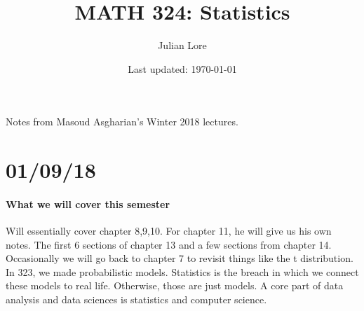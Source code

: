 \documentclass[12 pt]{article}
\author{Julian Lore}
\date{Last updated: \today}
\title{MATH 324: Statistics}
\begin{document}
	\onehalfspacing
	\maketitle
	Notes from Masoud Asgharian's Winter 2018 lectures.
	\tableofcontents
        \section{01/09/18}
        \paragraph{What we will cover this semester}
        Will essentially cover chapter 8,9,10. For chapter 11, he will
        give us his own notes. The first 6 sections of chapter 13 and
        a few sections from chapter 14. Occasionally we will go back
        to chapter 7 to revisit things like the t distribution.
        \\ In 323, we made probabilistic models. Statistics is the
        breach in which we connect these models to real
        life. Otherwise, those are just models. A core part of data
        analysis and data sciences is statistics and computer
        science.
\end{document}
